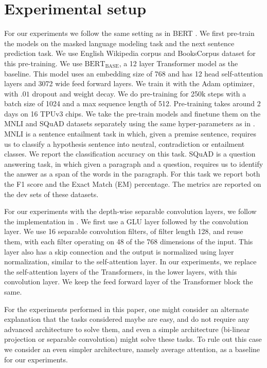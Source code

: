 \documentclass{article} %
\newcommand{\BB}{\text{BERT}_{\text{BASE}}}
\begin{document}
\section{Experimental setup}\label{sec:appx_experiments}

For our experiments we follow the same setting as in BERT \citep{devlin2018bert}. We first pre-train the models on the masked language modeling task and the next sentence prediction task. We use English Wikipedia corpus and BooksCorpus dataset \citep{zhu2015aligning} for this pre-training. We use $\BB$, a 12 layer Transformer model as the baseline. This model uses an embedding size of 768 and has 12 head self-attention layers and 3072 wide feed forward layers. We train it with the Adam optimizer, with $.01$ dropout and weight decay. We do pre-training for 250k steps with a batch size of 1024 and a max sequence length of 512. Pre-training takes around 2 days on 16 TPUv3 chips. We take the pre-train models and finetune them on the MNLI and SQuAD datasets separately using the same hyper-parameters as in \citet{devlin2018bert}. MNLI is a sentence entailment task in which, given a premise sentence, requires us to classify a hypothesis sentence into neutral, contradiction or entailment classes. We report the classification accuracy on this task. SQuAD is a question answering task, in which given a paragraph and a question, requires us to identify the answer as a span of the words in the paragraph. For this task we report both the F1 score and the Exact Match (EM) percentage. The metrics are reported on the dev sets of these datasets.

For our experiments with the depth-wise separable convolution layers, we follow the implementation in \citep{wu2019pay}. We first use a GLU layer followed by the convolution layer. We use 16 separable convolution filters, of filter length 128, and reuse them, with each filter operating on 48 of the 768 dimensions of the input. This layer also has a skip connection and the output is normalized using layer normalization, similar to the self-attention layer. In our experiments, we replace the self-attention layers of the Transformers, in the lower layers, with this convolution layer. We keep the feed forward layer of the Transformer block the same.

For the experiments performed in this paper, one might consider an alternate explanation that the tasks considered maybe are easy, and do not require any advanced architecture to solve them, and even a simple architecture (bi-linear projection or separable convolution) might solve these tasks. To rule out this case we consider an even simpler architecture, namely average attention, as a baseline for our experiments.
\end{document}
